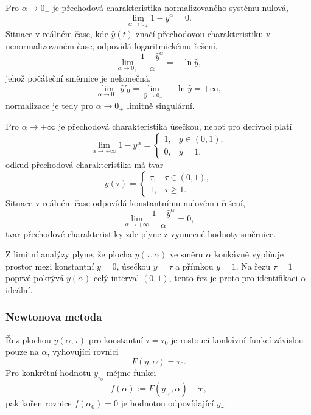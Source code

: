 Pro $\alpha\to0_+$ je přechodová charakteristika normalizovaného systému nulová,
\begin{equation}
    \lim_{\alpha\to0_+}1-y^\alpha=0.
\end{equation}
Situace v reálném čase, kde $\hat{y}(t)$ značí přechodovou charakteristiku v nenormalizovaném čase, odpovídá logaritmickému řešení,
\begin{equation}
    \lim_{\alpha\to0_+}\frac{1-\hat{y}^\alpha}{\alpha}=-\ln{\hat{y}},
\end{equation}
jehož počáteční směrnice je nekonečná,
\begin{equation}
    \lim_{\alpha\to0_+}\hat{y}'_0=\lim_{\hat{y}\to0_+}-\ln{\hat{y}}=+\infty,
\end{equation}
normalizace je tedy pro $\alpha\to0_+$ limitně singulární.

Pro $\alpha\to+\infty$ je přechodová charakteristika úsečkou, neboť pro derivaci platí
\begin{equation}
    \lim_{\alpha\to+\infty}1-y^\alpha=\begin{cases}1,&y\in(0,1),\\0,&y=1,\end{cases}
\end{equation}
odkud přechodová charakteristika má tvar
\begin{equation}
    y(\tau)=\begin{cases}\tau,&\tau\in(0,1),\\1,&\tau\geq1.\end{cases}
\end{equation}
Situace v reálném čase odpovídá konstantnímu nulovému řešení,
\begin{equation}
    \lim_{\alpha\to+\infty}\frac{1-\hat{y}^{\alpha}}{\alpha}=0,
\end{equation}
tvar přechodové charakteristiky zde plyne z vynucené hodnoty směrnice.

Z limitní analýzy plyne, že plocha $y(\tau,\alpha)$ ve směru $\alpha$ konkávně vyplňuje prostor mezi konstantní $y=0$, úsečkou $y=\tau$ a přímkou $y=1$. Na řezu $\tau=1$ poprvé pokrývá $y(\alpha)$ celý interval $(0,1)$, tento řez je proto pro identifikaci $\alpha$ ideální.

\subsubsection{Newtonova metoda}\label{sss:newtonova_metoda}
Řez plochou $y(\alpha,\tau)$ pro konstantní $\tau=\tau_0$ je rostoucí konkávní funkcí závislou pouze na $\alpha$, vyhovující rovnici
\begin{equation}
    F(y,\alpha)=\tau_0.
\end{equation}
Pro konkrétní hodnotu $y_{\tau_0}$ mějme funkci
\begin{equation}
    f(\alpha):=F(y_{\tau_0},\alpha)-\bm{\tau},
\end{equation}
pak kořen rovnice $f(\alpha_0)=0$ je hodnotou odpovídající $y_\tau$.


